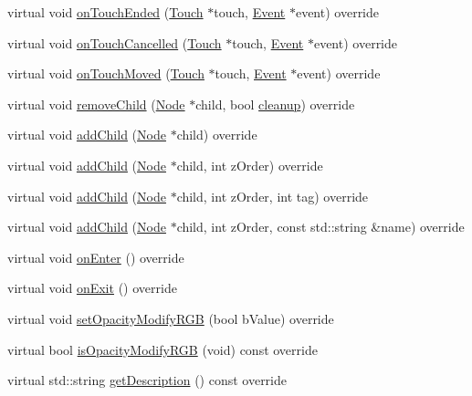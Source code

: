 \begin{DoxyCompactItemize}
virtual void \hyperlink{classMenu_a8d9a867ea2dfc4ec2a3309f3df71cc35}{on\+Touch\+Ended} (\hyperlink{classTouch}{Touch} $\ast$touch, \hyperlink{classEvent}{Event} $\ast$event) override
\item 
virtual void \hyperlink{classMenu_a19ffec24a2ec30dd290354e0e0e3aa9a}{on\+Touch\+Cancelled} (\hyperlink{classTouch}{Touch} $\ast$touch, \hyperlink{classEvent}{Event} $\ast$event) override
\item 
virtual void \hyperlink{classMenu_ad69115ad80e86bbe904d575253afc781}{on\+Touch\+Moved} (\hyperlink{classTouch}{Touch} $\ast$touch, \hyperlink{classEvent}{Event} $\ast$event) override
\item 
virtual void \hyperlink{classMenu_a671c3f506ddcf0532144056289721540}{remove\+Child} (\hyperlink{classNode}{Node} $\ast$child, bool \hyperlink{classNode_aa2de84c6cdeec9cd647d236c30ee0567}{cleanup}) override
\item 
virtual void \hyperlink{classMenu_af557403e8b14bdbda70d85b7d12fedfb}{add\+Child} (\hyperlink{classNode}{Node} $\ast$child) override
\item 
virtual void \hyperlink{classMenu_a38455f79cd083475d9beacf0cc9caf81}{add\+Child} (\hyperlink{classNode}{Node} $\ast$child, int z\+Order) override
\item 
virtual void \hyperlink{classMenu_a540593eb7fb7de286fe64d6da9c67618}{add\+Child} (\hyperlink{classNode}{Node} $\ast$child, int z\+Order, int tag) override
\item 
virtual void \hyperlink{classMenu_a9b9b2f71c16b7c420f6db12a68937ce5}{add\+Child} (\hyperlink{classNode}{Node} $\ast$child, int z\+Order, const std\+::string \&name) override
\item 
virtual void \hyperlink{classMenu_ab8c3b9d5d26f512be8f26e5e2f5bda1e}{on\+Enter} () override
\item 
virtual void \hyperlink{classMenu_a247a5912b1bc6aacedcdb41324de391c}{on\+Exit} () override
\item 
virtual void \hyperlink{classMenu_a7dc62dd40fb8b6cd4addee5fb38cb6b9}{set\+Opacity\+Modify\+R\+GB} (bool b\+Value) override
\item 
virtual bool \hyperlink{classMenu_ae173fda432df51ec761c8ef5d96ea59a}{is\+Opacity\+Modify\+R\+GB} (void) const override
\item 
virtual std\+::string \hyperlink{classMenu_a2f8bee450bcae21f9d5f27941467ff59}{get\+Description} () const override
\item 
\mbox{\label{classMenu_abee4c4ef3c95d8d27c26c4139c468e2e}} 

\end{DoxyCompactItemize}
